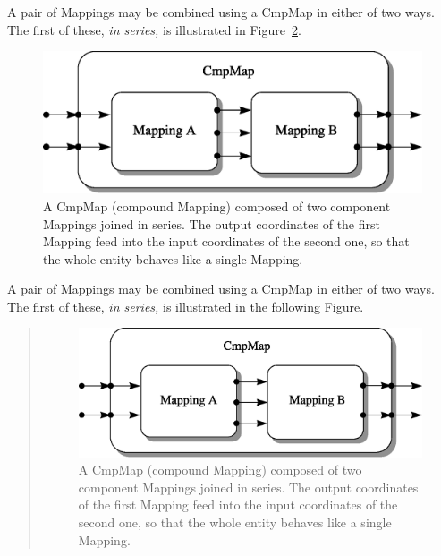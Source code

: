 \documentclass[twoside,11pt]{article}
\newenvironment{latexonly}{}{}
\begin{document}
\begin{latexonly}
   A pair of Mappings may be combined using a CmpMap in either of two
   ways. The first of these, {\em{in series,}} is illustrated in
   Figure~\ref{fig:seriescmpmap}.
   \begin{figure}
   \begin{center}
   \includegraphics[scale=0.5]{sun211_figures/series.eps}
   \caption{A CmpMap (compound Mapping) composed of two component
   Mappings joined in series. The output coordinates of the first Mapping
   feed into the input coordinates of the second one, so that the whole
   entity behaves like a single Mapping.}
   \label{fig:seriescmpmap}
   \end{center}
   \end{figure}
\end{latexonly}
\begin{htmlonly}
   A pair of Mappings may be combined using a CmpMap in either of two
   ways. The first of these, {\em{in series,}} is illustrated in the
   following Figure.
   \begin{quote}
   \begin{figure}
   \label{fig:seriescmpmap}
   \includegraphics[scale=1.0]{sun211_figures/series.eps}
   \caption{A CmpMap (compound Mapping) composed of two component
   Mappings joined in series. The output coordinates of the first Mapping
   feed into the input coordinates of the second one, so that the whole
   entity behaves like a single Mapping.}
   \end{figure}
   \end{quote}
\end{htmlonly}
\end{document}
